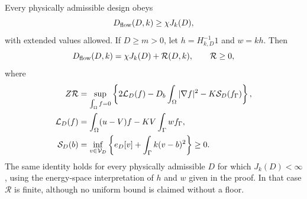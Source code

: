 \begin{proposition}
\label{prop:schur}
Every physically admissible design obeys
\begin{equation}\label{eq:bulk-lower}
 D_{\mathrm{flow}}(D,k)\ge\chi J_k(D),
\end{equation}
with extended values allowed. If $D\ge m>0$, let $h=H_{k,D}^{-1}1$
and $w=kh$. Then
\begin{equation}\label{eq:schur-identity}
 D_{\mathrm{flow}}(D,k)=\chi J_k(D)+\mathcal R(D,k),\qquad \mathcal R\ge0,
\end{equation}
where
\begin{align}
 Z\mathcal R&=\sup_{\int_\Omega f=0}
   \left\{2\mathcal L_D(f)-D_b\int_\Omega|\nabla f|^2-K\mathcal S_D(f_\Gamma)\right\},
       \label{eq:bulk-remainder}\\
 \mathcal L_D(f)&=\int_\Omega(u-V)f-KV\int_\Gamma wf_\Gamma,\notag\\
 \mathcal S_D(b)&=\inf_{v\in\mathcal V_D}
       \left\{e_D[v]+\int_\Gamma k(v-b)^2\right\}\ge0.\notag
\end{align}
The same identity holds for every physically admissible $D$ for which
$J_k(D)<\infty$, using the energy-space interpretation of $h$ and $w$
given in the proof. In that case $\mathcal R$ is finite, although no
uniform bound is claimed without a floor.
\end{proposition}
